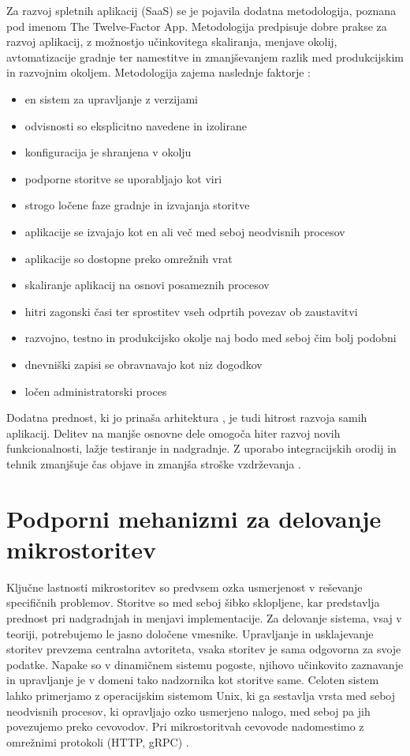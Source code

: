 \documentclass[a4paper, 12pt]{book}
\begin{document}
Za razvoj spletnih aplikacij (SaaS) se je pojavila dodatna metodologija, poznana pod imenom The Twelve-Factor App.
Metodologija predpisuje dobre prakse za razvoj aplikacij, z možnostjo učinkovitega skaliranja, menjave okolij, avtomatizacije gradnje ter namestitve in zmanjševanjem razlik med produkcijskim in razvojnim okoljem.
Metodologija zajema naslednje faktorje \cite{12factor}:
\begin{itemize}
	\item en sistem za upravljanje z verzijami
	\item odvisnosti so eksplicitno navedene in izolirane
	\item konfiguracija je shranjena v okolju
	\item podporne storitve se uporabljajo kot viri
	\item strogo ločene faze gradnje in izvajanja storitve
	\item aplikacije se izvajajo kot en ali več med seboj neodvisnih procesov
	\item aplikacije so dostopne preko omrežnih vrat
	\item skaliranje aplikacij na osnovi posameznih procesov
	\item hitri zagonski časi ter sprostitev vseh odprtih povezav ob zaustavitvi
	\item razvojno, testno in produkcijsko okolje naj bodo med seboj čim bolj podobni
	\item dnevniški zapisi se obravnavajo kot niz dogodkov
	\item ločen administratorski proces
\end{itemize}

Dodatna prednost, ki jo prinaša arhitektura , je tudi hitrost razvoja samih aplikacij.
Delitev na manjše osnovne dele omogoča hiter razvoj novih funkcionalnosti, lažje testiranje in nadgradnje.
Z uporabo integracijskih orodij in tehnik zmanjšuje čas objave in zmanjša stroške vzdrževanja \cite{stine2015migrating}.


\section{Podporni mehanizmi za delovanje mikrostoritev}

Ključne lastnosti mikrostoritev so predvsem ozka usmerjenost v reševanje specifičnih problemov.
Storitve so med seboj šibko sklopljene, kar predstavlja prednost pri nadgradnjah in menjavi implementacije.
Za delovanje sistema, vsaj v teoriji, potrebujemo le jasno določene vmesnike.
Upravljanje in usklajevanje storitev prevzema centralna avtoriteta, vsaka storitev je sama odgovorna za svoje podatke.
Napake so v dinamičnem sistemu pogoste, njihovo učinkovito zaznavanje in upravljanje je v domeni tako nadzornika kot storitve same.
Celoten sistem lahko primerjamo z operacijskim sistemom Unix, ki ga sestavlja vrsta med seboj neodvisnih procesov, ki opravljajo ozko usmerjeno nalogo, med seboj pa jih povezujemo preko cevovodov.
Pri mikrostoritvah cevovode nadomestimo z omrežnimi protokoli (HTTP, gRPC) \cite{microservicesMartin}.
\end{document}
